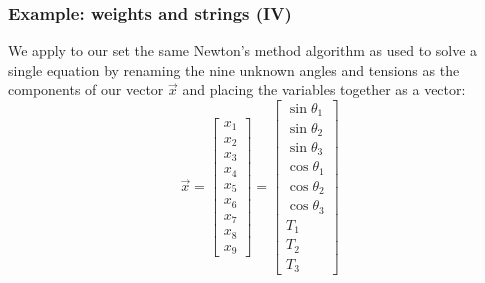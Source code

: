 \documentclass[hyperref={colorlinks=true}]{beamer}
\begin{document}

\begin{frame}%
  \frametitle{Example: weights and strings (IV)}

  We apply to our set the same Newton's method algorithm as used to solve a single equation by renaming the nine unknown angles and tensions as the components of our vector $\vec{x}$ and placing the variables together as a vector:
  \begin{equation}
    \vec{x} = \left[\begin{array}{c}
                      x_1 \\
                      x_2 \\
                      x_3 \\
                      x_4 \\
                      x_5 \\
                      x_6 \\
                      x_7 \\
                      x_8 \\
                      x_9        
                    \end{array}\right]
             = \left[\begin{array}{c}
                       \sin\theta_1 \\
                       \sin\theta_2 \\
                       \sin\theta_3 \\
                       \cos\theta_1 \\
                       \cos\theta_2 \\
                       \cos\theta_3 \\
                       T_1 \\
                       T_2 \\
                       T_3
                     \end{array}\right]  \nonumber                   
  \end{equation}

\end{frame}

\end{document}
